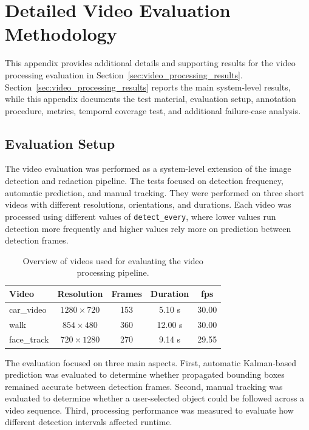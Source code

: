 \chapter{Detailed Video Evaluation Methodology}
\label{app:video_evaluation_details}

This appendix provides additional details and supporting results for the video processing evaluation in Section~\ref{sec:video_processing_results}. Section~\ref{sec:video_processing_results} reports the main system-level results, while this appendix documents the test material, evaluation setup, annotation procedure, metrics, temporal coverage test, and additional failure-case analysis.

\section{Evaluation Setup}

The video evaluation was performed as a system-level extension of the image detection and redaction pipeline. The tests focused on detection frequency, automatic prediction, and manual tracking. They were performed on three short videos with different resolutions, orientations, and durations. Each video was processed using different values of \texttt{detect\_every}, where lower values run detection more frequently and higher values rely more on prediction between detection frames.

\begin{table}[H]
\centering
\begin{tabular}{lcccc}
\toprule
\textbf{Video} & \textbf{Resolution} & \textbf{Frames} & \textbf{Duration} & \textbf{\acrshort{fps}} \\
\midrule
car\_video & $1280\times720$ & 153 & 5.10 s & 30.00 \\
walk & $854\times480$ & 360 & 12.00 s & 30.00 \\
face\_track & $720\times1280$ & 270 & 9.14 s & 29.55 \\
\bottomrule
\end{tabular}
\caption{Overview of videos used for evaluating the video processing pipeline.}
\label{tab:video_test_material}
\end{table}

The evaluation focused on three main aspects. First, automatic Kalman-based prediction was evaluated to determine whether propagated \gls{bounding box}es remained accurate between detection frames. Second, manual tracking was evaluated to determine whether a user-selected object could be followed across a video sequence. Third, processing performance was measured to evaluate how different detection intervals affected runtime.


